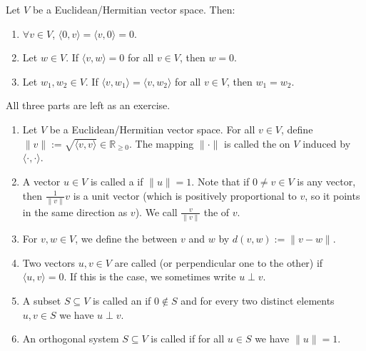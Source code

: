 \begin{lemma}
\label{lem:basic_properties_inner_prod}
Let $V$ be a Euclidean/Hermitian vector space. Then:
\begin{enumerate}[label=\textbf{(\alph*)}]
    \item $\forall v \in V$, $\langle 0, v \rangle = \langle v, 0 \rangle = 0$.
    \item Let $w \in V$. If $\langle v, w \rangle = 0$ for all $v \in V$, then $w = 0$.
    \item Let $w_1, w_2 \in V$. If $\langle v, w_1 \rangle = \langle v, w_2 \rangle$ for all $v \in V$, then $w_1 = w_2$.
\end{enumerate}
All three parts are left as an exercise.
\end{lemma}

\begin{definition}
\label{def:norm_distance_orthogonality}
\begin{enumerate}[label=\textbf{(\alph*)}]
    \item Let $V$ be a Euclidean/Hermitian vector space. For all $v \in V$, define $\|v\| := \sqrt{\langle v, v \rangle} \in \mathbb{R}_{\geq 0}$. The mapping $\| \cdot \|$ is called the  on $V$ induced by $\langle \cdot, \cdot \rangle$.
    \item A vector $u \in V$ is called a  if $\|u\| = 1$. Note that if $0 \neq v \in V$ is any vector, then $\frac{1}{\|v\|}v$ is a unit vector (which is positively proportional to $v$, so it points in the same direction as $v$). We call $\frac{v}{\|v\|}$ the  of $v$.
    \item For $v, w \in V$, we define the  between $v$ and $w$ by $d(v, w) := \|v - w\|$.
    \item Two vectors $u, v \in V$ are called  (or perpendicular one to the other) if $\langle u, v \rangle = 0$. If this is the case, we sometimes write $u \perp v$.
    \item A subset $S \subseteq V$ is called an  if $0 \notin S$ and for every two distinct elements $u, v \in S$ we have $u \perp v$.
    \item An orthogonal system $S \subseteq V$ is called  if for all $u \in S$ we have $\|u\| = 1$.
\end{enumerate}
\end{definition}

